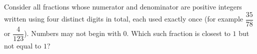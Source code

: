 Consider all fractions whose numerator and denominator are positive integers written using four distinct digits in total, each used exactly once (for example $\dfrac{35}{78}$ or $\dfrac{4}{123}$). Numbers may not begin with $0$. Which such fraction is closest to $1$ but not equal to $1$?
